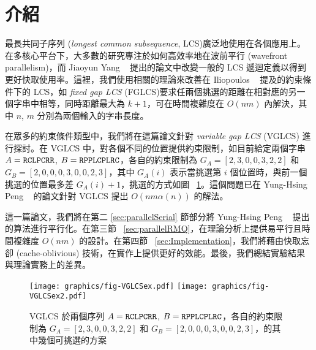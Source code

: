 \section{介紹} %
\label{sec:Introduction}

最長共同子序列 (\emph{longest common subsequence}, LCS)廣泛地使用在各個應用上。在多核心平台下，大多數的研究專注於如何高效率地在波前平行 (wavefront parallelism)，而 Jiaoyun Yang ~\cite{jiaoyun} 提出的論文中改變一般的 LCS 遞迴定義以得到更好快取使用率。這裡，我們使用相關的理論來改善在 Iliopoulos ~\cite{iliopoulos} 提及的約束條件下的 LCS，如 \emph{fixed gap LCS } (FGLCS)要求任兩個挑選的距離在相對應的另一個字串中相等，同時距離最大為 $k+1$，可在時間複雜度在 $O(nm)$ 內解決，其中 $n$, $m$ 分別為兩個輸入的字串長度。

在眾多的約束條件類型中，我們將在這篇論文針對 \emph{variable gap LCS} (VGLCS) 進行探討。在 VGLCS 中，對各個不同的位置提供約束限制，如目前給定兩個字串 $A = \tt{RCLPCRR}$, $B = \tt{RPPLCPLRC}$，各自的約束限制為 $G_A = [2, 3, 0, 0, 3, 2, 2]$ 和 $G_B = [2, 0, 0, 0, 3, 0, 0, 2, 3]$，其中 $G_A(i)$ 表示當挑選第 $i$ 個位置時，與前一個挑選的位置最多差 $G_A(i)+1$，挑選的方式如圖 ~\ref{fig:VGLCSex}。這個問題已在 Yung-Hsing Peng ~\cite{yunghsing} 的論文針對 VGLCS 提出 $O(nm \alpha(n))$ 的解法。

這一篇論文，我們將在第二 \ref{sec:parallelSerial} 節部分將 Yung-Hsing Peng ~\cite{yunghsing} 提出的算法進行平行化。在第三節 ~\ref{sec:parallelRMQ}，在理論分析上提供易平行且時間複雜度 $O(nm)$ 的設計。在第四節 ~\ref{sec:Implementation}，我們將藉由快取忘卻 (cache-oblivious) 技術，在實作上提供更好的效能。最後，我們總結實驗結果與理論實務上的差異。

\begin{figure}[!thb]
  \centering
  \texttt{[image: graphics/fig-VGLCSex.pdf]}
  \texttt{[image: graphics/fig-VGLCSex2.pdf]}
  \caption{VGLCS 於兩個序列 $A = \tt{RCLPCRR}$, $B = \tt{RPPLCPLRC}$，各自的約束限制為 $G_A = [2, 3, 0, 0, 3, 2, 2]$ 和 $G_B = [2, 0, 0, 0, 3, 0, 0, 2, 3]$，的其中幾個可挑選的方案}
  \label{fig:VGLCSex}
\end{figure}